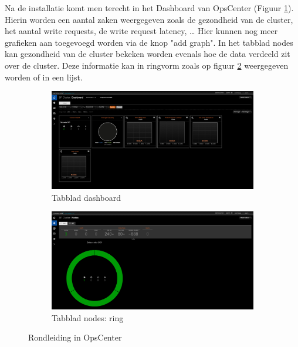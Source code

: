 Na de installatie komt men terecht in het Dashboard van OpsCenter (Figuur \ref{fig:cas_opscenter_tour_dashboard}).
Hierin worden een aantal zaken weergegeven zoals de gezondheid van de cluster, het aantal write requests, de write request latency, \ldots
Hier kunnen nog meer grafieken aan toegevoegd worden via de knop "add graph".
In het tabblad nodes kan gezondheid van de cluster bekeken worden evenals hoe de data verdeeld zit over de cluster.
Deze informatie kan in ringvorm zoals op figuur \ref{fig:cas_opscenter_tour_nodes} weergegeven worden of in een lijst.

\begin{figure}[H]
	\centering
	\begin{subfigure}{.49\textwidth}
		\centering
		\includegraphics[width=.99\linewidth]{img/4_installatie_cassandra/2_Tour_1_Dashboard}
		\caption{Tabblad dashboard}
		\label{fig:cas_opscenter_tour_dashboard}
	\end{subfigure}
	\begin{subfigure}{.49\textwidth}
		\centering
		\includegraphics[width=.99\linewidth]{img/4_installatie_cassandra/2_Tour_2_Nodes}
		\caption{Tabblad nodes: ring}
		\label{fig:cas_opscenter_tour_nodes}
	\end{subfigure}
	\caption{Rondleiding in OpsCenter}
	\label{fig:cas_opscenter_tour}
\end{figure}


